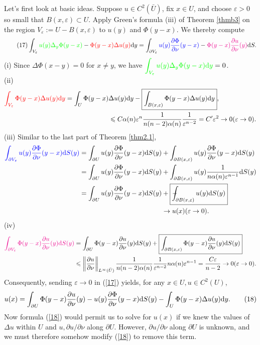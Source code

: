 \documentclass[hyperref,UTF8,12pt]{article}
\numberwithin{equation}{subsection}
\theoremstyle{plain}
\theoremstyle{definition}
\numberwithin{theorem}{section}
\numberwithin{lemma}{section}
\numberwithin{proposition}{section}
\numberwithin{remark}{section}
\numberwithin{corollary}{section}
\numberwithin{definition}{section}
\numberwithin{problem}{section}
\numberwithin{example}{section}
\def\dif{\textup{d}}
\def\Xint#1{\mathchoice
	{\XXint\displaystyle\textstyle{#1}}%
	{\XXint\textstyle\scriptstyle{#1}}%
	{\XXint\scriptstyle\scriptscriptstyle{#1}}%
	{\XXint\scriptscriptstyle\scriptscriptstyle{#1}}%
	\!\int}
\def\XXint#1#2#3{{\setbox0=\hbox{$#1{#2#3}{\int}$ }
		\vcenter{\hbox{$#2#3$ }}\kern-.55\wd0}}
\def\dashint{\Xint-}
\newcommand{\dis}{\displaystyle}
\newcommand{\ptl}{\partial}
\renewcommand{\leq}{\leqslant}
\newcommand{\ve}{\varepsilon}
\begin{document}
Let's first look at basic ideas. Suppose $u\in C^2(\bar{U})$, fix $x \in U$, and choose $\ve>0$ so small that $B(x,\ve)\subset U$. Apply Green's formula (iii) of Theorem \ref{thmb3} on the region $V_\ve:=U-B(x,\ve)$ to $u(y)$ and $\Phi(y-x)$. We thereby compute\[\tag{17}\label{17} \int_{V_\ve}\textcolor{green}{u(y)\Delta_y\Phi(y-x)}-\textcolor{red}{\Phi(y-x)\Delta u(y)}\dif y=\int_{\ptl V_\ve}\textcolor{blue}{u(y)\frac{\ptl \Phi}{\ptl\nu}(y-x)}-\textcolor{magenta}{\Phi(y-x)\frac{\ptl u}{\ptl\nu}(y)}\dif S.\]
(i) Since $\Delta\Phi(x-y)=0$ for $x\neq y$, we have $\dis\textcolor{green}{\int_{V_\ve}u(y)\Delta_y\Phi(y-x)\dif y}=0$.\\
(ii)\[\begin{aligned}
	\textcolor{red}{\int_{V_\ve}\Phi(y-x)\Delta u(y)\dif y}=\int_U\Phi(y-x)&\Delta u(y)\dif y-\boxed{\int_{B(x,\ve)}\Phi(y-x)\Delta u(y)\dif y},\\
	&\leq C\alpha(n)\ve^n\frac{1}{n(n-2)\alpha(n)}\frac{1}{\ve^{n-2}}=C^\prime\ve^2\to 0(\ve\to0).
\end{aligned}\]
(iii) Similar to the last part of Theorem \ref{thm2.1},\[\begin{aligned}
	\textcolor{blue}{\int_{\ptl V_\ve}u(y)\frac{\ptl\Phi}{\ptl\nu}(y-x)\dif S(y)}=\int_{\ptl U}u(y)\frac{\ptl\Phi}{\ptl\nu}(y-x)\dif S(y)&+\int_{\ptl B(x,\ve)}u(y)\frac{\ptl\Phi}{\ptl\nu}(y-x)\dif S(y)\\
	=\int_{\ptl U}u(y)\frac{\ptl\Phi}{\ptl\nu}(y-x)\dif S(y)&+\int_{\ptl B(x,\ve)}u(y)\frac{1}{n\alpha(n)\ve^{n-1}}\dif S(y)\\
	=\int_{\ptl U}u(y)\frac{\ptl\Phi}{\ptl\nu}(y-x)\dif S(y)&+\boxed{\dashint_{\ptl B(x,\ve)}u(y)\dif S(y)}\\
	&\to u(x)(\ve\to0).
\end{aligned}\]
(iv)\[\begin{aligned}
	\textcolor{magenta}{\int_{\ptl V_\ve}\Phi(y-x)\frac{\ptl u}{\ptl\nu}(y)\dif S(y)}&=\int_{\ptl U}\Phi(y-x)\frac{\ptl u}{\ptl\nu}(y)\dif S(y)+\boxed{\int_{\ptl B(x,\ve)}\Phi(y-x)\frac{\ptl u}{\ptl\nu}(y)\dif S(y)}\\
	&\leq\left\|\frac{\ptl u}{\ptl\nu}\right\|_{L^{\infty}(\bar{U})}\frac{1}{n(n-2) \alpha(n)}\frac{1}{\ve^{n-2}}n\alpha(n)\ve^{n-1}=\frac{C\ve}{n-2}\to0(\ve\to0).
\end{aligned}\]
Consequently, sending $\ve\to0$ in (\ref{17}) yields, for any $x\in U,u\in C^2(U)$, \[u(x)=\int_{\ptl U}\Phi(y-x)\frac{\ptl u}{\ptl\nu}(y)-u(y)\frac{\ptl\Phi}{\ptl \nu}(y-x)\dif S(y)-\int_U\Phi(y-x)\Delta u(y)\dif y.\tag{18}\label{18}\]
Now formula (\ref{18}) would permit us to solve for $u(x)$ if we knew the values of $\Delta u$ within $U$ and $u,\ptl u/\ptl\nu$ along $\ptl U$. However, $\ptl u/\ptl\nu$ along $\ptl U$ is unknown, and we must therefore somehow modify (\ref{18}) to remove this term.
\end{document}
